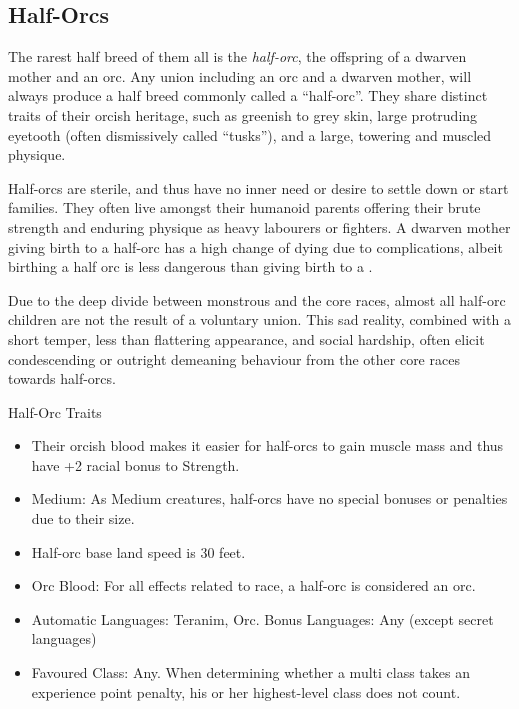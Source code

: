 \subsection{Half-Orcs}
\label{sec:Half-Orcs}

The rarest half breed of them all is the \emph{half-orc}, the offspring of a
dwarven mother and an orc. Any union including an orc and a dwarven mother,
will always produce a half breed commonly called a ``half-orc''. They share
distinct traits of their orcish heritage, such as greenish to grey skin, large
protruding eyetooth (often dismissively called ``tusks''), and a large,
towering and muscled physique.

Half-orcs are sterile, and thus have no inner need or desire to settle down or
start families. They often live amongst their humanoid parents offering their
brute strength and enduring physique as heavy labourers or fighters. A dwarven
mother giving birth to a half-orc has a high change of dying due to
complications, albeit birthing a half orc is less dangerous than giving birth
to a .

Due to the deep divide between monstrous and the core races, almost all
half-orc children are not the result of a voluntary union. This sad reality,
combined with a short temper, less than flattering appearance, and social
hardship, often elicit condescending or outright demeaning behaviour from the
other core races towards half-orcs.

\begin{35e}{Half-Orc Traits}
  \begin{itemize}[noitemsep]
    \item Their orcish blood makes it easier for half-orcs to gain muscle mass
      and thus have +2 racial bonus to Strength.
    \item Medium: As Medium creatures, half-orcs have no special bonuses or
      penalties due to their size.
    \item Half-orc base land speed is 30 feet.
    \item Orc Blood: For all effects related to race, a half-orc is considered
    an orc.
    \item Automatic Languages: Teranim, Orc. Bonus Languages: Any (except secret
      languages)
    \item Favoured Class: Any. When determining whether a multi class takes an
    experience point penalty, his or her highest-level class does not count.
  \end{itemize}
\end{35e}
